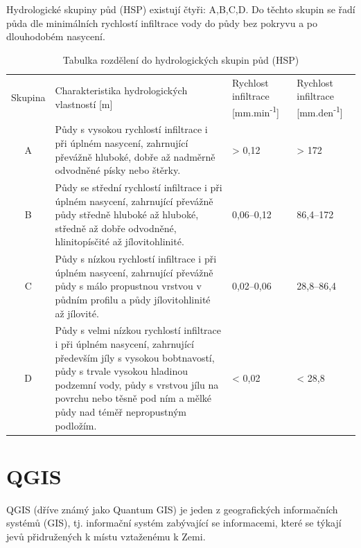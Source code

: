 \documentclass[a4paper,oneside,12pt]{book}
\begin{document}
\hspace{10mm} Hydrologické skupiny půd (HSP) existují čtyři: A,B,C,D. Do těchto skupin se řadí půda dle minimálních rychlostí infiltrace vody do půdy bez pokryvu a po dlouhodobém nasycení.\cite{MNYDGwleJOjKdRUp}
\begin{table}[htbp]
  \centering
  \caption{Tabulka rozdělení do hydrologických skupin půd (HSP) \cite{MNYDGwleJOjKdRUp}} 
  \label{tab:HSP}
  \begin{tabular}{|c|p{6cm}|p{2.5cm}|p{2.5cm}|}
    \hline
    Skupina & Charakteristika hydrologických vlastností [m] & 
    Rychlost infiltrace [mm.min\textsuperscript{-1}] & Rychlost infiltrace [mm.den\textsuperscript{-1}] \\
    \hhline{=|=|=|=|}
    A & Půdy s vysokou rychlostí infiltrace i při úplném nasycení, zahrnující převážně hluboké, dobře až nadměrně odvodněné písky nebo štěrky. & > 0,12 & > 172 \\
    \hline
    B & Půdy se střední rychlostí infiltrace i při úplném nasycení, zahrnující převážně půdy středně hluboké až hluboké, středně až dobře odvodněné, hlinitopísčité až jílovitohlinité. & 0,06–0,12 & 86,4–172 \\
    \hline
    C & Půdy s nízkou rychlostí infiltrace i při úplném nasycení, zahrnující převážně půdy s málo propustnou vrstvou v půdním profilu a půdy jílovitohlinité až jílovité. & 0,02–0,06 & 28,8–86,4 \\
    \hline
    D & Půdy s velmi nízkou rychlostí infiltrace i při úplném nasycení, zahrnující především jíly s vysokou bobtnavostí, půdy s trvale vysokou hladinou podzemní vody, půdy s vrstvou jílu na povrchu nebo těsně pod ním a mělké půdy nad téměř nepropustným podložím. & < 0,02 & < 28,8 \\
    \hline
  \end{tabular}
  
\end{table}

\newpage
\chapter{QGIS} \label{qgis}
\hspace{10mm} QGIS (dříve známý jako Quantum GIS) je jeden z geografických informačních systémů (GIS), tj.  informační systém zabývající se informacemi, které se týkají jevů přidružených k místu vztaženému k Zemi. \cite{dONaeOjXanl1W2md}
\end{document}
